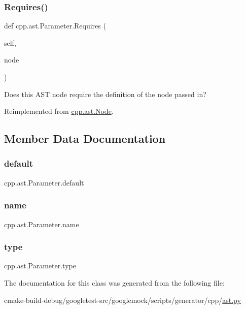 \subsubsection{\texorpdfstring{Requires()}{Requires()}}
{\footnotesize\ttfamily def cpp.\+ast.\+Parameter.\+Requires (\begin{DoxyParamCaption}\item[{}]{self,  }\item[{}]{node }\end{DoxyParamCaption})}

\begin{DoxyVerb}Does this AST node require the definition of the node passed in?\end{DoxyVerb}
 

Reimplemented from \mbox{\hyperlink{classcpp_1_1ast_1_1Node_a31ae211f954a8c578ef16226df5ac8c8}{cpp.\+ast.\+Node}}.



\subsection{Member Data Documentation}
\mbox{\label{classcpp_1_1ast_1_1Parameter_a4ceae2ac87d82c5542c4e7385eb4c97e}} 
\subsubsection{\texorpdfstring{default}{default}}
{\footnotesize\ttfamily cpp.\+ast.\+Parameter.\+default}

\mbox{\label{classcpp_1_1ast_1_1Parameter_aae0375fb0ded8fa9090feea6bdff2784}} 
\subsubsection{\texorpdfstring{name}{name}}
{\footnotesize\ttfamily cpp.\+ast.\+Parameter.\+name}

\mbox{\label{classcpp_1_1ast_1_1Parameter_a5eed090000c41551a10c21f175ad33e3}} 
\subsubsection{\texorpdfstring{type}{type}}
{\footnotesize\ttfamily cpp.\+ast.\+Parameter.\+type}



The documentation for this class was generated from the following file\+:\begin{DoxyCompactItemize}
\item 
cmake-\/build-\/debug/googletest-\/src/googlemock/scripts/generator/cpp/\mbox{\hyperlink{ast_8py}{ast.\+py}}\end{DoxyCompactItemize}
